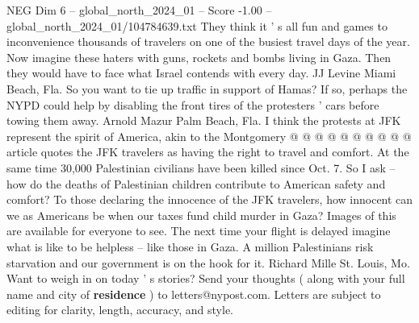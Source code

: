 \begin{textsample}{NEG Dim 6 – global\_north\_2024\_01 – Score -1.00 – global\_north\_2024\_01/104784639.txt}
They think it ' s all fun and games to inconvenience thousands of travelers on one of the busiest travel days of the year.
Now imagine these haters with guns, rockets and bombs living in Gaza.
Then they would have to face what Israel contends with every day.
JJ Levine Miami Beach, Fla.
So you want to tie up traffic in support of Hamas?
If so, perhaps the NYPD could help by disabling the front tires of the protesters ' cars before towing them away.
Arnold Mazur Palm Beach, Fla.
I think the protests at JFK represent the spirit of America, akin to the Montgomery @ @ @ @ @ @ @ @ @ @ article quotes the JFK travelers as having the right to travel and comfort.
At the same time 30,000 Palestinian civilians have been killed since Oct. 7.
So I ask -- how do the deaths of Palestinian children contribute to American safety and comfort?
To those declaring the innocence of the JFK travelers, how innocent can we as Americans be when our taxes fund child murder in Gaza?
Images of this are available for everyone to see.
The next time your flight is delayed imagine what is like to be helpless -- like those in Gaza.
A million Palestinians risk starvation and our government is on the hook for it.
Richard Mille St.
Louis, Mo.
Want to weigh in on today ' s stories?
Send your thoughts ( along with your full name and city of \textbf{residence} ) to letters@nypost.com.
Letters are subject to editing for clarity, length, accuracy, and style.

\end{textsample}
